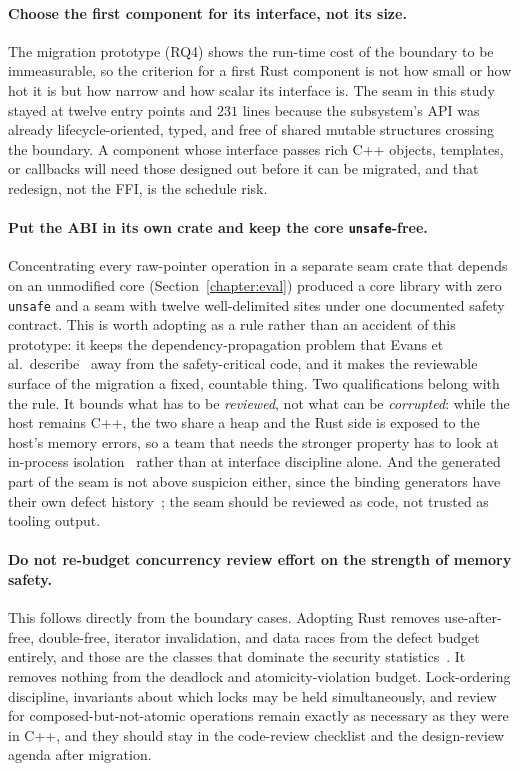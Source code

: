\documentclass[english,twoside,openright,a4paper,censored,csm,software-track-2020]{HYthesisML}
\begin{document}
\paragraph{Choose the first component for its interface, not its size.}
The migration prototype (RQ4) shows the run-time cost of the boundary to be immeasurable, so
the criterion for a first Rust component is not how small or how hot it is but how narrow and
how scalar its interface is. The seam in this study stayed at twelve entry points and $231$
lines because the subsystem's API was already lifecycle-oriented, typed, and free of shared
mutable structures crossing the boundary. A component whose interface passes rich C++ objects,
templates, or callbacks will need those designed out before it can be migrated, and that
redesign, not the FFI, is the schedule risk.

\paragraph{Put the ABI in its own crate and keep the core \texttt{unsafe}-free.}
Concentrating every raw-pointer operation in a separate seam crate that depends on an
unmodified core (Section~\ref{chapter:eval}) produced a core library with zero \texttt{unsafe}
and a seam with twelve well-delimited sites under one documented safety contract. This is
worth adopting as a rule rather than an accident of this prototype: it keeps the
dependency-propagation problem that Evans et al.\ describe~\cite{evans2020rust} away from the
safety-critical code, and it makes the reviewable surface of the migration a fixed, countable
thing. Two qualifications belong with the rule. It bounds what has to be
\emph{reviewed}, not what can be \emph{corrupted}: while the host remains C++, the two share a
heap and the Rust side is exposed to the host's memory errors, so a team that needs the
stronger property has to look at in-process isolation~\cite{rivera2021galeed,kirth2022pkrusafe}
rather than at interface discipline alone. And the generated part of the seam is not above
suspicion either, since the binding generators have their own defect
history~\cite{cai2026interop}; the seam should be reviewed as code, not trusted as tooling
output.

\paragraph{Do not re-budget concurrency review effort on the strength of memory safety.}
This follows directly from the boundary cases. Adopting Rust removes use-after-free,
double-free, iterator invalidation, and data races from the defect budget entirely, and those
are the classes that dominate the security statistics~\cite{msrc2019memory,google2022android}.
It removes nothing from the deadlock and atomicity-violation budget. Lock-ordering discipline,
invariants about which locks may be held simultaneously, and review for
composed-but-not-atomic operations remain exactly as necessary as they were in C++, and they
should stay in the code-review checklist and the design-review agenda after migration.
\end{document}
